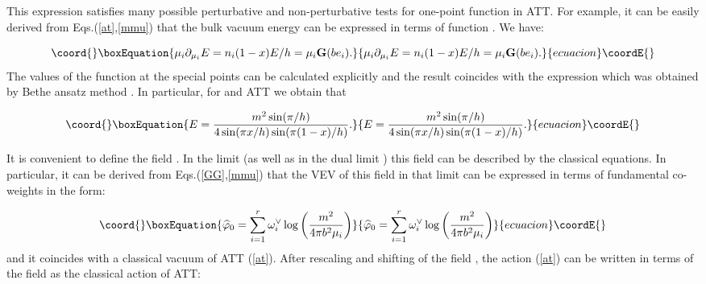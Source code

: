 \documentclass[a4paper,12pt,titlepage,final]{article}
\begin{document}
This expression satisfies many possible perturbative and non-perturbative
tests for one-point function in ATT. For example, it can be easily derived
from Eqs.(\ref{at},\ref{mmu}) that the bulk vacuum energy \coordHE{} can be
expressed in terms of function \coordHE{}. We have:

\begin{equation}\coord{}\boxEquation{
\mu _{i}\partial _{\mu _{i}}E=n_{i}(1-x)E/h=\mu _{i}\mathbf{G}(be_{i}).
\label{EB}
}{
\mu _{i}\partial _{\mu _{i}}E=n_{i}(1-x)E/h=\mu _{i}\mathbf{G}(be_{i}).
}{ecuacion}\coordE{}\end{equation}
The values of the function \coordHE{} at the special points
\coordHE{} can be calculated explicitly and the result coincides with the
expression which was obtained by Bethe ansatz method \cite{ABF}. In
particular, for \coordHE{} and \coordHE{} ATT we obtain that

\begin{equation}\coord{}\boxEquation{
E=\frac{m^{2}\sin (\pi /h)}{4\sin (\pi x/h)\sin (\pi (1-x)/h)}. 
\label{BCBC}
}{
E=\frac{m^{2}\sin (\pi /h)}{4\sin (\pi x/h)\sin (\pi (1-x)/h)}. 
}{ecuacion}\coordE{}\end{equation}

It is convenient to define the field \coordHE{}.
In the limit \coordHE{} (as well as in the dual limit \coordHE{}) this field can be described by the classical equations.
In particular, it can be derived from Eqs.(\ref{GG},\ref{mmu}) that the VEV
of this field \coordHE{} in that limit can be expressed in terms of
fundamental co-weights in the form:

\begin{equation}\coord{}\boxEquation{
\widehat{\varphi }_{0}=\sum_{i=1}^{r}\omega _{i}^{\vee }
\log \left( \frac{m^{2}}{4\pi b^{2}\mu _{i}}\right)  \label{vcl}
}{
\widehat{\varphi }_{0}=\sum_{i=1}^{r}\omega _{i}^{\vee }
\log \left( \frac{m^{2}}{4\pi b^{2}\mu _{i}}\right)  }{ecuacion}\coordE{}\end{equation}
and it coincides with a classical vacuum of ATT (\ref{at}). After
rescaling and
shifting of the field \myHighlight{$\varphi$}\coordHE{}, the action (\ref{at}) can be written in
terms of the field \coordHE{} as the
classical action of ATT:
\end{document}

